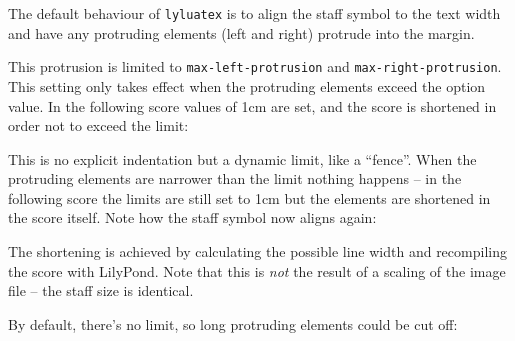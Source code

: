 \documentclass{scrartcl}
\begin{document}
The default behaviour of \texttt{lyluatex} is to align the staff symbol to the
text width and have any protruding elements (left and right) protrude into the
margin.


This protrusion is limited to \texttt{max-left-protrusion} and
\texttt{max-right-protrusion}.  This setting only takes effect when the
protruding elements exceed the option value.  In the following score values of
1cm are set, and the score is shortened in order not to exceed the limit:


This is no explicit indentation but a dynamic limit, like a “fence”. When the
protruding elements are narrower than the limit nothing happens -- in the
following score the limits are still set to 1cm but the elements are shortened
in the score itself.  Note how the staff symbol now aligns again:


\bigskip
The shortening is achieved by calculating the possible line width and
recompiling the score with LilyPond.  Note that this is \emph{not} the result of
a scaling of the image file -- the staff size is identical.


\bigskip
By default, there's no limit, so long protruding elements could be cut off:

\end{document}
